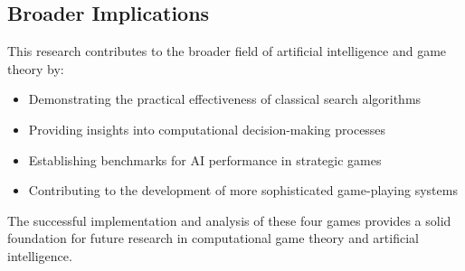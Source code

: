 \documentclass[12pt]{article}
\begin{document}
\subsection{Broader Implications}

This research contributes to the broader field of artificial intelligence and game theory by:

\begin{itemize}
    \item Demonstrating the practical effectiveness of classical search algorithms
    \item Providing insights into computational decision-making processes
    \item Establishing benchmarks for AI performance in strategic games
    \item Contributing to the development of more sophisticated game-playing systems
\end{itemize}

The successful implementation and analysis of these four games provides a solid foundation for future research in computational game theory and artificial intelligence.
\end{document}
